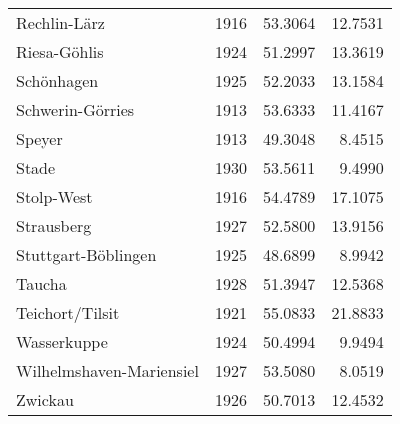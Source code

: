\begin{table}[h!]
\begin{tabular}{p{2.8cm}rrr}
  Rechlin-Lärz & 1916 & 53.3064 & 12.7531 \\ 
  Riesa-Göhlis & 1924 & 51.2997 & 13.3619 \\ 
  Schönhagen & 1925 & 52.2033 & 13.1584 \\ 
  Schwerin-Görries & 1913 & 53.6333 & 11.4167 \\ 
   \midrule
Speyer & 1913 & 49.3048 & 8.4515 \\ 
  Stade & 1930 & 53.5611 & 9.4990 \\ 
  Stolp-West & 1916 & 54.4789 & 17.1075 \\ 
  Strausberg & 1927 & 52.5800 & 13.9156 \\ 
  Stuttgart-Böblingen & 1925 & 48.6899 & 8.9942 \\ 
  Taucha & 1928 & 51.3947 & 12.5368 \\ 
  Teichort/Tilsit & 1921 & 55.0833 & 21.8833 \\ 
  Wasserkuppe & 1924 & 50.4994 & 9.9494 \\ 
  Wilhelmshaven-Mariensiel & 1927 & 53.5080 & 8.0519 \\ 
  Zwickau & 1926 & 50.7013 & 12.4532 \\ 
   \midrule
 \bottomrule
\end{tabular}
\endgroup
\end{table}

